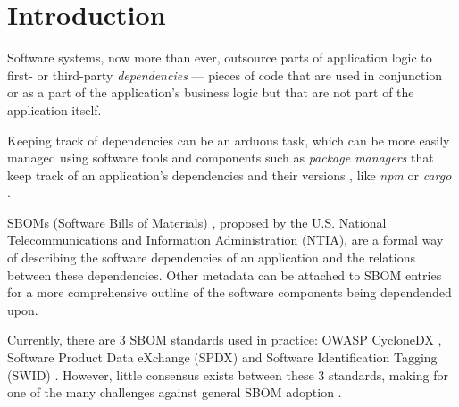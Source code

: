 \section{Introduction}

Software systems, now more than ever, outsource parts of application logic to first- or third-party \emph{dependencies} --- pieces of code that are used in conjunction or as a part of the application's business logic but that are not part of the application itself.

Keeping track of dependencies can be an arduous task, which can be more easily managed using software tools and components such as \emph{package managers} that keep track of an application's dependencies and their versions \cite{article:package-manager}, like \emph{npm} or \emph{cargo} \cite{tools:pkg-mngr:npm,tools:pkg-mngr:cargo}.

SBOMs (Software Bills of Materials) \cite{article:concept:sbom-2}, proposed by the U.S. National Telecommunications and Information Administration (NTIA), are a formal way of describing the software dependencies of an application and the relations between these dependencies. Other metadata can be attached to SBOM entries for a more comprehensive outline of the software components being dependended upon.

Currently, there are 3 SBOM standards used in practice: OWASP CycloneDX \cite{standards:sbom:cyclonedx}, Software Product Data eXchange (SPDX) \cite{standards:sbom:spdx} and Software Identification Tagging (SWID) \cite{standards:sbom:swid}. However, little consensus exists between these 3 standards, making for one of the many challenges against general SBOM adoption \cite{article:sbom-study}.

